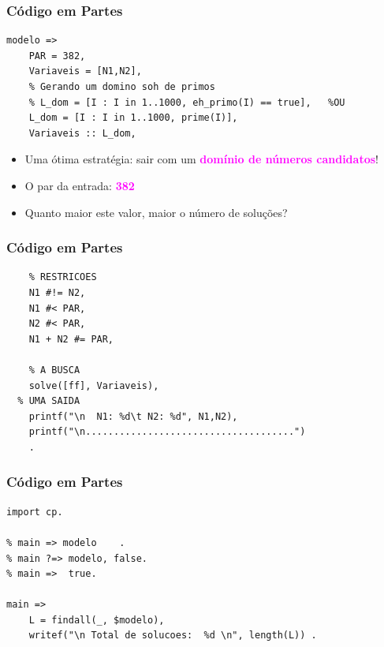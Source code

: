 \begin{frame}[fragile] 

\frametitle{Código em Partes}

\begin{footnotesize}
\begin{verbatim}
modelo => 
    PAR = 382,
    Variaveis = [N1,N2],
    % Gerando um domino soh de primos
    % L_dom = [I : I in 1..1000, eh_primo(I) == true],   %OU
    L_dom = [I : I in 1..1000, prime(I)],
    Variaveis :: L_dom,
\end{verbatim}
\end{footnotesize}
   
   
   
   \begin{itemize}
   \pause
     \item Uma ótima estratégia: sair com um \textbf{\textcolor{magenta}{domínio de números candidatos}}!
   \pause
     \item O par da entrada: \textcolor{magenta}{\textbf{382}}

     \item Quanto maior este valor, maior o número de soluções?
   \end{itemize}

    
\end{frame}
\begin{frame}[fragile] 

\frametitle{Código em Partes}

\begin{footnotesize}
\begin{verbatim}
    % RESTRICOES
    N1 #!= N2,
    N1 #< PAR,  
    N2 #< PAR,
    N1 + N2 #= PAR,
  
	% A BUSCA
	solve([ff], Variaveis),
  % UMA SAIDA
	printf("\n  N1: %d\t N2: %d", N1,N2),
	printf("\n.....................................")
	.
\end{verbatim}
\end{footnotesize}
    
\end{frame}
\begin{frame}[fragile] 

\frametitle{Código em Partes}

\begin{footnotesize}
\begin{verbatim}
import cp.

% main => modelo	.
% main ?=> modelo, false.	
% main =>  true.	

main =>
    L = findall(_, $modelo),
    writef("\n Total de solucoes:  %d \n", length(L)) .

\end{verbatim}
\end{footnotesize}
    
\end{frame}


